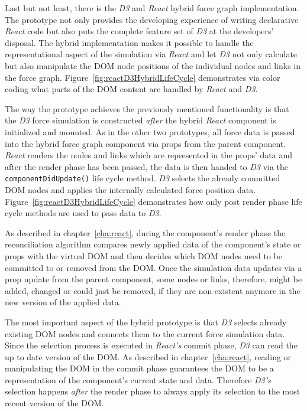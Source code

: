 Last but not least, there is the \emph{D3} and \emph{React} hybrid force graph implementation. The prototype not only provides the developing experience of writing declarative \emph{React} code but also puts the complete feature set of \emph{D3} at the developers' disposal. The hybrid implementation makes it possible to handle the representational aspect of the simulation via \emph{React} and let \emph{D3} not only calculate but also manipulate the DOM node positions of the individual nodes and links in the force graph. Figure~\ref{fig:reactD3HybridLifeCycle} demonstrates via color coding what parts of the DOM content are handled by \emph{React} and \emph{D3}. 

The way the prototype achieves the previously mentioned functionality is that the \emph{D3} force simulation is constructed \emph{after} the hybrid \emph{React} component is initialized and mounted. As in the other two prototypes, all force data is passed into the hybrid force graph component via props from the parent component. \emph{React} renders the nodes and links which are represented in the props' data and after the render phase has been passed, the data is then handed to \emph{D3} via the \texttt{componentDidUpdate()} life cycle method. \emph{D3} selects the already committed DOM nodes and applies the internally calculated force position data. Figure~\ref{fig:reactD3HybridLifeCycle} demonstrates how only post render phase life cycle methods are used to pass data to \emph{D3}.

As described in chapter~\ref{cha:react}, during the component's render phase the reconciliation algorithm compares newly applied data of the component's state or props with the virtual DOM and then decides which DOM nodes need to be committed to or removed from the DOM. Once the simulation data updates via a prop update from the parent component, some nodes or links, therefore, might be added, changed or could just be removed, if they are non-existent anymore in the new version of the applied data.

The most important aspect of the hybrid prototype is that \emph{D3} selects already existing DOM nodes and connects them to the current force simulation data. Since the selection process is executed in \emph{React's} commit phase, \emph{D3} can read the up to date version of the DOM. As described in chapter~\ref{cha:react}, reading or manipulating the DOM in the commit phase guarantees the DOM to be a representation of the component's current state and data. Therefore \emph{D3's} selection happens \emph{after} the render phase to always apply its selection to the most recent version of the DOM.


